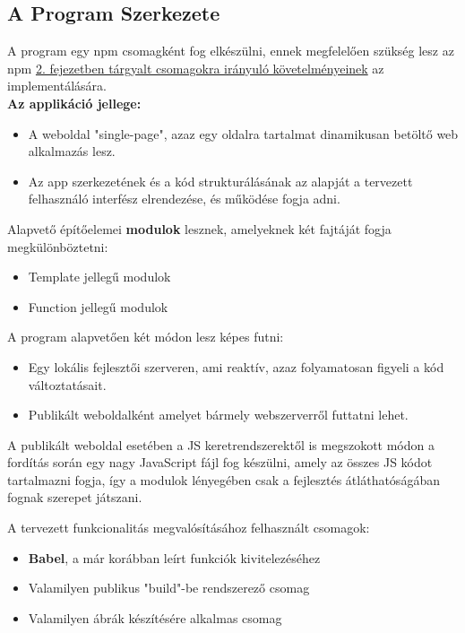 \pagebreak

\subsection{A Program Szerkezete}

A program egy npm csomagként fog elkészülni, ennek megfelelően szükség lesz az npm \hyperlink{section2.2}{2. fejezetben tárgyalt csomagokra irányuló követelményeinek} az implementálására.\\

\textbf{Az applikáció jellege:}

\begin{itemize}
	\item A weboldal "single-page", azaz egy oldalra tartalmat dinamikusan betöltő web alkalmazás lesz.
	\item Az app szerkezetének és a kód strukturálásának az alapját a tervezett felhasználó interfész elrendezése, és működése fogja adni.
\end{itemize}

\noindent Alapvető építőelemei \textbf{modulok} lesznek, amelyeknek két fajtáját fogja megkülönböztetni:

\begin{itemize}
	\item Template jellegű modulok
	\item Function jellegű modulok
\end{itemize}

\noindent A program alapvetően két módon lesz képes futni:

\begin{itemize}
	\item Egy lokális fejlesztői szerveren, ami reaktív, azaz folyamatosan figyeli a kód változtatásait.
	\item Publikált weboldalként amelyet bármely webszerverről futtatni lehet.
\end{itemize}

\noindent A publikált weboldal esetében a JS keretrendszerektől is megszokott módon a fordítás során egy nagy JavaScript fájl fog készülni, amely az összes JS kódot tartalmazni fogja, így a modulok lényegében csak a fejlesztés átláthatóságában fognak szerepet játszani.

\noindent A tervezett funkcionalitás megvalósításához felhasznált csomagok:
\begin{itemize}
	\item \textbf{Babel}, a már korábban leírt funkciók kivitelezéséhez
	\item Valamilyen publikus "build"-be rendszerező csomag
	\item Valamilyen ábrák készítésére alkalmas csomag
\end{itemize}

